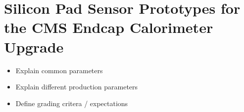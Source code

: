 \section{Silicon Pad Sensor Prototypes for the CMS Endcap Calorimeter Upgrade}
\label{sec:sensors}

\begin{itemize}
    \item Explain common parameters
    \item Explain different production parameters
    \item Define grading critera / expectations
\end{itemize}